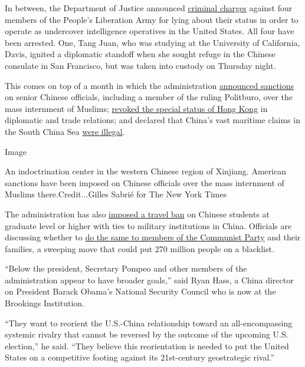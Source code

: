 In between, the Department of Justice announced
\href{https://www.justice.gov/opa/pr/researchers-charged-visa-fraud-after-lying-about-their-work-china-s-people-s-liberation-army}{criminal
charges} against four members of the People's Liberation Army for lying
about their status in order to operate as undercover intelligence
operatives in the United States. All four have been arrested. One, Tang
Juan, who was studying at the University of California, Davis, ignited a
diplomatic standoff when she sought refuge in the Chinese consulate in
San Francisco, but was taken into custody on Thursday night.

This comes on top of a month in which the administration
\href{https://www.nytimes.com/2020/07/09/world/asia/trump-china-sanctions-uighurs.html}{announced
sanctions} on senior Chinese officials, including a member of the ruling
Politburo, over the mass internment of Muslims;
\href{https://www.nytimes.com/2020/07/15/world/asia/china-trump-hong-kong.html}{revoked
the special status of Hong Kong} in diplomatic and trade relations; and
declared that China's vast maritime claims in the South China Sea
\href{https://www.nytimes.com/2020/07/13/world/asia/south-china-sea-pompeo.html}{were
illegal}.

Image

An indoctrination center in the western Chinese region of Xinjiang.
American sanctions have been imposed on Chinese officials over the mass
internment of Muslims there.Credit...Gilles Sabrié for The New York
Times

The administration has also
\href{https://www.nytimes.com/2020/05/28/us/politics/china-hong-kong-trump-student-visas.html}{imposed
a travel ban} on Chinese students at graduate level or higher with ties
to military institutions in China. Officials are discussing whether to
\href{https://www.nytimes.com/2020/07/15/us/politics/china-travel-ban.html}{do
the same to members of the Communist Party} and their families, a
sweeping move that could put 270 million people on a blacklist.

``Below the president, Secretary Pompeo and other members of the
administration appear to have broader goals,'' said Ryan Hass, a China
director on President Barack Obama's National Security Council who is
now at the Brookings Institution.

``They want to reorient the U.S.-China relationship toward an
all-encompassing systemic rivalry that cannot be reversed by the outcome
of the upcoming U.S. election,'' he said. ``They believe this
reorientation is needed to put the United States on a competitive
footing against its 21st-century geostrategic rival.''

